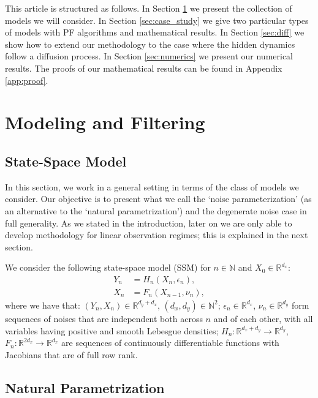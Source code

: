 \documentclass[english,13pt]{article}
\numberwithin{equation}{section}
\begin{document}
This article is structured as follows.  In Section \ref{sec:model} we present the collection of models we will consider.
In Section \ref{sec:case_study} we give two particular types of models with PF algorithms and mathematical results.
In Section \ref{sec:diff} we show how to extend our methodology to the case where the hidden dynamics follow a diffusion process.
In Section \ref{sec:numerics} we present our numerical results.  The proofs of our mathematical results can be found in Appendix \ref{app:proof}.

\section{Modeling and Filtering}\label{sec:model}

\subsection{State-Space Model}

In this section, we work in a general setting in terms of the class of models we consider. 
Our objective is to present what we call the 
`noise parameterization' (as an alternative to the `natural parametrization') and the degenerate noise case in full generality.  As we stated in the introduction,  later on we are only able to develop methodology for linear observation regimes; this is explained in the next section.  

We consider the following state-space model (SSM) for $n\in\mathbb{N}$ and $X_0\in\mathbb{R}^{d_x}$:
%
\begin{align*}
Y_n & = H_n(X_n,\epsilon_n), \\
X_n & =  F_n(X_{n-1},\nu_n),
\end{align*}
%
where we have that: $(Y_n,X_n)\in\mathbb{R}^{d_y+d_x}$, $(d_x,d_y)\in\mathbb{N}^2$;  $\epsilon_n\in\mathbb{R}^{d_x}$, $\nu_n\in\mathbb{R}^{d_y}$ form  sequences of noises that are  independent both across $n$ and of each other, with all variables having  positive and smooth Lebesgue densities;  $H_n:\mathbb{R}^{d_x+d_y}\rightarrow\mathbb{R}^{d_y}$, $F_n:\mathbb{R}^{2d_x}\rightarrow\mathbb{R}^{d_x}$ are  sequences of  continuously differentiable functions with Jacobians that are of full row rank.

\subsection{Natural Parametrization}
\end{document}
